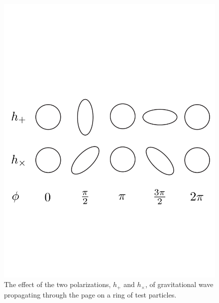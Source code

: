 \begin{figure}[p]
\begin{center}
\includegraphics[width=\linewidth]{figures/inspiral/rings}
\end{center}
\caption[Effect of a Gravitational Wave on a Ring of Particles]{%
\label{f:rings}%
The effect of the two polarizations, $h_+$ and $h_\times$, of gravitational
wave propagating through the page on a ring of test particles. 
}
\end{figure}

